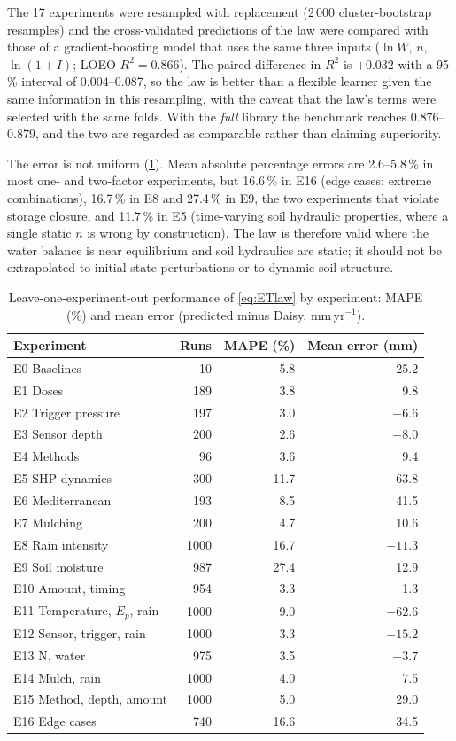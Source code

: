 \documentclass[preprint,12pt,authoryear]{elsarticle}
\begin{document}
The 17 experiments were resampled with replacement (2\,000 cluster-bootstrap resamples) and the cross-validated predictions of the law were compared with those of a gradient-boosting model that uses the same three inputs ($\ln W$, $n$, $\ln(1+I)$; LOEO $R^2=0.866$). The paired difference in $R^2$ is $+0.032$ with a 95\,\% interval of 0.004--0.087, so the law is better than a flexible learner given the same information in this resampling, with the caveat that the law's terms were selected with the same folds. With the \emph{full} library the benchmark reaches 0.876--0.879, and the two are regarded as comparable rather than claiming superiority.

The error is not uniform (\cref{tab:byexp}). Mean absolute percentage errors are 2.6--5.8\,\% in most one- and two-factor experiments, but 16.6\,\% in E16 (edge cases: extreme combinations), 16.7\,\% in E8 and 27.4\,\% in E9, the two experiments that violate storage closure, and 11.7\,\% in E5 (time-varying soil hydraulic properties, where a single static $n$ is wrong by construction). The law is therefore valid where the water balance is near equilibrium and soil hydraulics are static; it should not be extrapolated to initial-state perturbations or to dynamic soil structure.

\begin{table}[H]\centering\small
\caption{Leave-one-experiment-out performance of \cref{eq:ETlaw} by experiment: MAPE (\%) and mean error (predicted minus Daisy, mm\,yr$^{-1}$).}
\label{tab:byexp}
\begin{tabular}{lrrr}
\toprule
Experiment & Runs & MAPE (\%) & Mean error (mm)\\\midrule
E0 Baselines & 10 & 5.8 & $-25.2$\\
E1 Doses & 189 & 3.8 & 9.8\\
E2 Trigger pressure & 197 & 3.0 & $-6.6$\\
E3 Sensor depth & 200 & 2.6 & $-8.0$\\
E4 Methods & 96 & 3.6 & 9.4\\
E5 SHP dynamics & 300 & 11.7 & $-63.8$\\
E6 Mediterranean & 193 & 8.5 & 41.5\\
E7 Mulching & 200 & 4.7 & 10.6\\
E8 Rain intensity & 1000 & 16.7 & $-11.3$\\
E9 Soil moisture & 987 & 27.4 & 12.9\\
E10 Amount, timing & 954 & 3.3 & 1.3\\
E11 Temperature, $E_p$, rain & 1000 & 9.0 & $-62.6$\\
E12 Sensor, trigger, rain & 1000 & 3.3 & $-15.2$\\
E13 N, water & 975 & 3.5 & $-3.7$\\
E14 Mulch, rain & 1000 & 4.0 & 7.5\\
E15 Method, depth, amount & 1000 & 5.0 & 29.0\\
E16 Edge cases & 740 & 16.6 & 34.5\\\bottomrule
\end{tabular}
\end{table}
\end{document}
